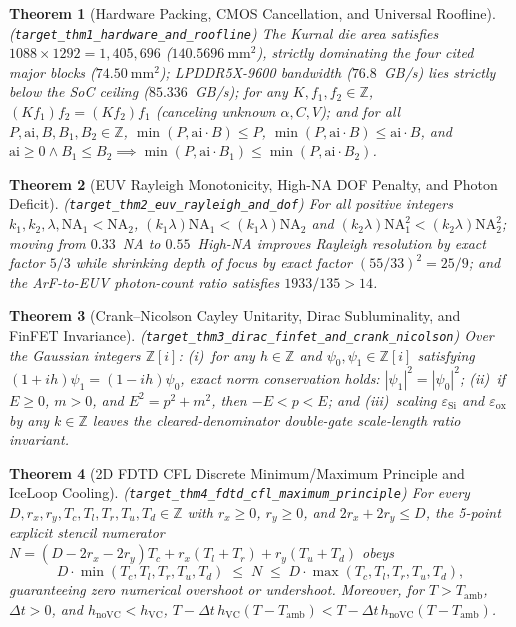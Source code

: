 \documentclass[11pt,a4paper]{amsart}
\newcommand{\code}[1]{{\small\nolinkurl{#1}}}
\newtheorem{theorem}{Theorem}[section]
\theoremstyle{remark}
\newcommand{\Z}{\mathbb{Z}}
\begin{document}
\begin{theorem}[Hardware Packing, CMOS Cancellation, and Universal Roofline]
\label{thm:hardware}
\textup{(\code{target_thm1_hardware_and_roofline})}
The Kurnal die area satisfies $1088\times 1292 = 1{,}405{,}696$ ($140.5696~\mathrm{mm}^2$),
strictly dominating the four cited major blocks ($74.50~\mathrm{mm}^2$);
LPDDR5X-9600 bandwidth ($76.8$~GB/s) lies strictly below the SoC ceiling ($85.336$~GB/s);
for any $K, f_1, f_2 \in \Z$, $(K f_1) f_2 = (K f_2) f_1$ (canceling unknown $\alpha, C, V$);
and for all $P, \mathrm{ai}, B, B_1, B_2 \in \Z$, $\min(P, \mathrm{ai}\cdot B) \le P$,
$\min(P, \mathrm{ai}\cdot B) \le \mathrm{ai}\cdot B$, and $\mathrm{ai} \ge 0 \land B_1 \le B_2
\implies \min(P, \mathrm{ai}\cdot B_1) \le \min(P, \mathrm{ai}\cdot B_2)$.
\end{theorem}

\begin{theorem}[EUV Rayleigh Monotonicity, High-NA DOF Penalty, and Photon Deficit]
\label{thm:litho}
\textup{(\code{target_thm2_euv_rayleigh_and_dof})}
For all positive integers $k_1, k_2, \lambda, \mathrm{NA}_1 < \mathrm{NA}_2$,
$(k_1\lambda)\mathrm{NA}_1 < (k_1\lambda)\mathrm{NA}_2$ and
$(k_2\lambda)\mathrm{NA}_1^2 < (k_2\lambda)\mathrm{NA}_2^2$; moving from
$0.33$~NA to $0.55$~High-NA improves Rayleigh resolution by exact factor $5/3$
while shrinking depth of focus by exact factor $(55/33)^2 = 25/9$; and the
ArF-to-EUV photon-count ratio satisfies $1933/135 > 14$.
\end{theorem}

\begin{theorem}[Crank--Nicolson Cayley Unitarity, Dirac Subluminality, and FinFET Invariance]
\label{thm:quantum-transport}
\textup{(\code{target_thm3_dirac_finfet_and_crank_nicolson})}
Over the Gaussian integers $\Z[i]$: (i)~for any $h \in \Z$ and $\psi_0, \psi_1 \in \Z[i]$
satisfying $(1 + ih)\psi_1 = (1 - ih)\psi_0$, exact norm conservation holds:
$|\psi_1|^2 = |\psi_0|^2$; (ii)~if $E \ge 0$, $m > 0$, and $E^2 = p^2 + m^2$,
then $-E < p < E$; and (iii)~scaling $\varepsilon_{\mathrm{Si}}$ and
$\varepsilon_{\mathrm{ox}}$ by any $k \in \Z$ leaves the cleared-denominator
double-gate scale-length ratio invariant.
\end{theorem}

\begin{theorem}[2D FDTD CFL Discrete Minimum/Maximum Principle and IceLoop Cooling]
\label{thm:thermal}
\textup{(\code{target_thm4_fdtd_cfl_maximum_principle})}
For every $D, r_x, r_y, T_c, T_l, T_r, T_u, T_d \in \Z$ with $r_x \ge 0$,
$r_y \ge 0$, and $2 r_x + 2 r_y \le D$, the 5-point explicit stencil numerator
$N = (D - 2r_x - 2r_y)T_c + r_x(T_l + T_r) + r_y(T_u + T_d)$ obeys
\[
  D \cdot \min(T_c, T_l, T_r, T_u, T_d) \;\le\; N \;\le\; D \cdot \max(T_c, T_l, T_r, T_u, T_d),
\]
guaranteeing zero numerical overshoot or undershoot. Moreover, for $T > T_{\mathrm{amb}}$,
$\Delta t > 0$, and $h_{\mathrm{noVC}} < h_{\mathrm{VC}}$,
$T - \Delta t\, h_{\mathrm{VC}}(T - T_{\mathrm{amb}}) < T - \Delta t\, h_{\mathrm{noVC}}(T - T_{\mathrm{amb}})$.
\end{theorem}
\end{document}
